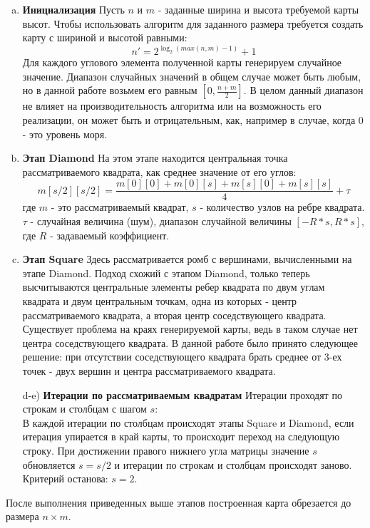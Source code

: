 \documentclass{article}
\numberwithin{equation}{section}
\begin{document}
			\begin{enumerate}[a)]
				\item \textbf{Инициализация}
					Пусть $n$ и $m$ - заданные ширина и высота требуемой карты высот. Чтобы использовать алгоритм для заданного размера требуется создать карту с шириной и высотой равными:
					\[ n' = 2^{\log_2 (max(n,m) - 1)} + 1 \]
					Для каждого углового элемента полученной карты генерируем случайное значение. Диапазон случайных значений в общем случае может быть любым, но в данной работе возьмем его равным $[0, \frac{n + m}{2}]$. В целом данный диапазон не влияет на производительность алгоритма или на возможность его реализации, он может быть и отрицательным, как, например в случае, когда 0 - это уровень моря.
				\item \textbf{Этап Diamond}
					На этом этапе находится центральная точка рассматриваемого квадрата, как среднее значение от его углов:
					\[ m[s/2][s/2] = \frac{m[0][0] + m[0][s] + m[s][0] + m[s][s]}{4} + \tau \]
					где $m$ - это рассматриваемый квадрат, $s$ - количество узлов на ребре квадрата. $\tau$ - случайная величина (шум), диапазон случайной величины $[-R * s, R * s]$, где $R$ - задаваемый коэффициент.
				\item \textbf{Этап Square}
					Здесь рассматривается ромб с вершинами, вычисленными на этапе Diamond. Подход схожий с этапом Diamond, только теперь высчитываются центральные элементы ребер квадрата по двум углам квадрата и двум центральным точкам, одна из которых - центр рассматриваемого квадрата, а вторая центр соседствующего квадрата. Существует проблема на краях генерируемой карты, ведь в таком случае нет центра соседствующего квадрата. В данной работе было принято следующее решение: при отсутствии соседствующего квадрата брать среднее от 3-ех точек - двух вершин и центра рассматриваемого квадрата.
				\item[d-e)] \textbf{Итерации по рассматриваемым квадратам}
					Итерации проходят по строкам и столбцам с шагом $s$:\\
					В каждой итерации по столбцам происходят этапы Square и Diamond, если итерация упирается в край карты, то происходит переход на следующую строку. При достижении правого нижнего угла матрицы значение $s$ обновляется $s = s / 2$ и итерации по строкам и столбцам происходят заново.\\
					Критерий останова: $s = 2$.
			\end{enumerate}

			После выполнения приведенных выше этапов построенная карта обрезается до размера $n \times m$.
\end{document}
